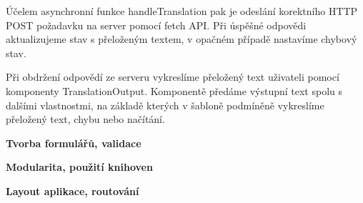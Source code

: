 Účelem asynchronní funkce handleTranslation pak je odeslání korektního HTTP POST požadavku na server pomocí fetch API. 
Při úspěšné odpovědi aktualizujeme stav s přeloženým textem, v opačném případě nastavíme chybový stav.

Při obdržení odpovědí ze serveru vykreslíme přeložený text uživateli pomocí komponenty TranslationOutput. 
Komponentě předáme výstupní text spolu s dalšími vlastnostmi, na základě kterých v šabloně podmíněně vykreslíme přeložený text, chybu nebo načítání.

\begin{flushleft}
  \textbf{Tvorba formulářů, validace}
\end{flushleft}

\begin{flushleft}
  \textbf{Modularita, použití knihoven}
\end{flushleft}

\begin{flushleft}
  \textbf{Layout aplikace, routování}
\end{flushleft}